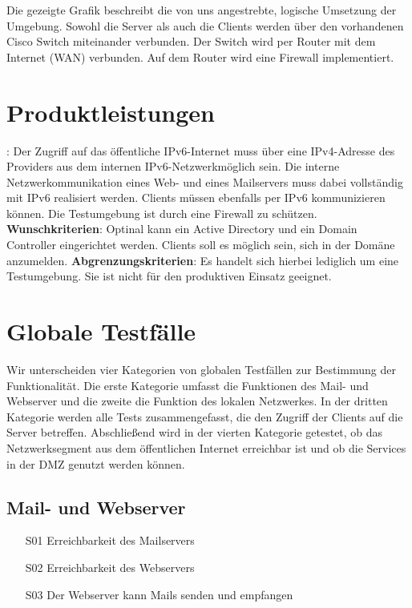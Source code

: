 Die gezeigte Grafik beschreibt die von uns angestrebte, logische Umsetzung der Umgebung. Sowohl die Server als auch die Clients werden über den vorhandenen Cisco Switch miteinander verbunden. Der Switch wird per Router mit dem Internet (WAN) verbunden. Auf dem Router wird eine Firewall implementiert.







\section{Produktleistungen}

: Der Zugriff auf das öffentliche IPv6-Internet muss über eine IPv4-Adresse des Providers aus dem internen IPv6-Netzwerkmöglich sein. Die interne Netzwerkommunikation eines Web- und eines Mailservers muss dabei vollständig mit IPv6 realisiert werden. Clients müssen ebenfalls per IPv6 kommunizieren können. Die Testumgebung ist durch eine Firewall zu schützen. {\bf Wunschkriterien}: Optinal kann ein Active Directory und ein Domain Controller eingerichtet werden. Clients soll es möglich sein, sich in der Domäne anzumelden. {\bf Abgrenzungskriterien}: Es handelt sich hierbei lediglich um eine Testumgebung. Sie ist nicht für den produktiven Einsatz geeignet.\section{Globale Testfälle}

Wir unterscheiden vier Kategorien von globalen Testfällen zur Bestimmung der Funktionalität. Die erste Kategorie umfasst die Funktionen des Mail- und Webserver und die zweite die Funktion des lokalen Netzwerkes. In der dritten Kategorie werden alle Tests zusammengefasst, die den Zugriff der Clients auf die Server betreffen. Abschließend wird in der vierten Kategorie getestet, ob das Netzwerksegment aus dem öffentlichen Internet erreichbar ist und ob die Services in der DMZ genutzt werden können.

\subsection{Mail- und Webserver}
\begin{itemize}
	\item[S01] Erreichbarkeit des Mailservers
	\item[S02] Erreichbarkeit des Webservers
	\item[S03] Der Webserver kann Mails senden und empfangen
\end{itemize}
